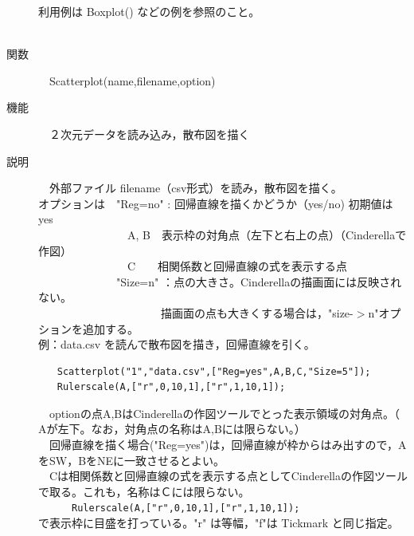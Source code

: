 \documentclass[papersize,a4paper,12pt,uplatex]{jsarticle}
\begin{document}
\begin{description}
利用例は Boxplot() などの例を参照のこと。\\
　\\

\hypertarget{scatterplot}{}
\item[関数]　Scatterplot(name,filename,option)
\item[機能]　２次元データを読み込み，散布図を描く
\item[説明]　外部ファイル filename（csv形式）を読み，散布図を描く。\\
オプションは　"Reg=no" : 回帰直線を描くかどうか（yes/no) 初期値は yes\\
　　　　　　　　A, B　表示枠の対角点（左下と右上の点）（Cinderellaで作図）\\
　　　　　　　　C　　相関係数と回帰直線の式を表示する点\\
　　　　　　　"Size=n"  ：点の大きさ。Cinderellaの描画面には反映されない。\\
　　　　　　　　　　　描画面の点も大きくする場合は，"size-$>$n"オプションを追加する。\\
例：data.csv を読んで散布図を描き，回帰直線を引く。
\begin{verbatim}
　　Scatterplot("1","data.csv",["Reg=yes",A,B,C,"Size=5"]);
　　Rulerscale(A,["r",0,10,1],["r",1,10,1]);
\end{verbatim}
　optionの点A,BはCinderellaの作図ツールでとった表示領域の対角点。（ Aが左下。なお，対角点の名称はA,Bには限らない。）\\
　回帰直線を描く場合("Reg=yes")は，回帰直線が枠からはみ出すので，AをSW，BをNEに一致させるとよい。\\
　Cは相関係数と回帰直線の式を表示する点としてCinderellaの作図ツールで取る。これも，名称はＣには限らない。\\
　　　\verb|Rulerscale(A,["r",0,10,1],["r",1,10,1]);|\\
 で表示枠に目盛を打っている。"r" は等幅，"f"は Tickmark  と同じ指定。\\
　\\
　　　　　\\
\end{description}
\newpage

\end{document}
